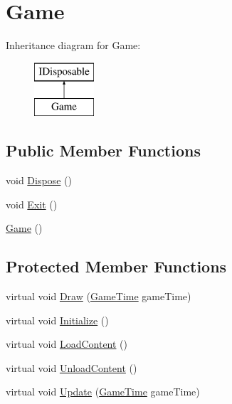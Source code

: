 \hypertarget{classMicrosoft_1_1Xna_1_1Framework_1_1Game}{}\section{Game}
\label{classMicrosoft_1_1Xna_1_1Framework_1_1Game}
Inheritance diagram for Game\+:\begin{figure}[H]
\begin{center}
\leavevmode
\includegraphics[height=2.000000cm]{classMicrosoft_1_1Xna_1_1Framework_1_1Game}
\end{center}
\end{figure}
\subsection*{Public Member Functions}
\begin{DoxyCompactItemize}
\item 
void \hyperlink{classMicrosoft_1_1Xna_1_1Framework_1_1Game_a6e2d745cdb7a7b983f861ed6a9a541a7}{Dispose} ()
\item 
void \hyperlink{classMicrosoft_1_1Xna_1_1Framework_1_1Game_a1a6a7739e9cc01ba888b57d1f9457f4c}{Exit} ()
\item 
\hyperlink{classMicrosoft_1_1Xna_1_1Framework_1_1Game_a98d87ba6bde3f389e92664a2ef9bfcb1}{Game} ()
\end{DoxyCompactItemize}
\subsection*{Protected Member Functions}
\begin{DoxyCompactItemize}
\item 
virtual void \hyperlink{classMicrosoft_1_1Xna_1_1Framework_1_1Game_a078e5c353c9457b3cd901835275f8ce3}{Draw} (\hyperlink{classMicrosoft_1_1Xna_1_1Framework_1_1GameTime}{Game\+Time} game\+Time)
\item 
virtual void \hyperlink{classMicrosoft_1_1Xna_1_1Framework_1_1Game_ab32ab0cc76b4eaa37077e89ee9e3cdc1}{Initialize} ()
\item 
virtual void \hyperlink{classMicrosoft_1_1Xna_1_1Framework_1_1Game_ac890255ff0686308815752ac03c85525}{Load\+Content} ()
\item 
virtual void \hyperlink{classMicrosoft_1_1Xna_1_1Framework_1_1Game_a2e15681fbc59da5df29d8db2296226db}{Unload\+Content} ()
\item 
virtual void \hyperlink{classMicrosoft_1_1Xna_1_1Framework_1_1Game_a3eea3bf79c4b8de42d784742e26c4566}{Update} (\hyperlink{classMicrosoft_1_1Xna_1_1Framework_1_1GameTime}{Game\+Time} game\+Time)
\end{DoxyCompactItemize}
